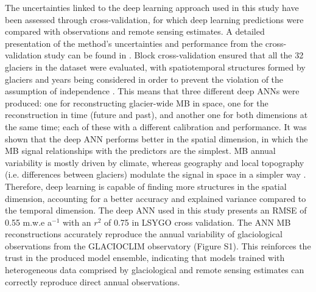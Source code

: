 The uncertainties linked to the deep learning approach used in this study have been assessed through cross-validation, for which deep learning predictions were compared with observations and remote sensing estimates. A detailed presentation of the method's uncertainties and performance from the cross-validation study can be found in \citet{bolibar_deep_2020-1}. Block cross-validation ensured that all the 32 glaciers in the dataset were evaluated, with spatiotemporal structures formed by glaciers and years being considered in order to prevent the violation of the assumption of independence \citep{roberts_cross-validation_2017}. This means that three different deep ANNs were produced: one for reconstructing glacier-wide MB in space, one for the reconstruction in time (future and past), and another one for both dimensions at the same time; each of these with a different calibration and performance. It was shown that the deep ANN performs better in the spatial dimension, in which the MB signal relationships with the predictors are the simplest. MB annual variability is mostly driven by climate, whereas geography and local topography (i.e. differences between glaciers) modulate the signal in space in a simpler way \citep{vincent_common_2017, bolibar_deep_2020-1}. Therefore, deep learning is capable of finding more structures in the spatial dimension, accounting for a better accuracy and explained variance compared to the temporal dimension. The deep ANN used in this study presents an RMSE of 0.55 m.w.e a$^{-1}$ with an $r^{2}$ of 0.75 in LSYGO cross validation. The ANN MB reconstructions accurately reproduce the annual variability of glaciological observations from the GLACIOCLIM observatory (Figure S1). This reinforces the trust in the produced model ensemble, indicating that models trained with  heterogeneous data comprised by glaciological and remote sensing estimates can correctly reproduce direct annual observations.  

